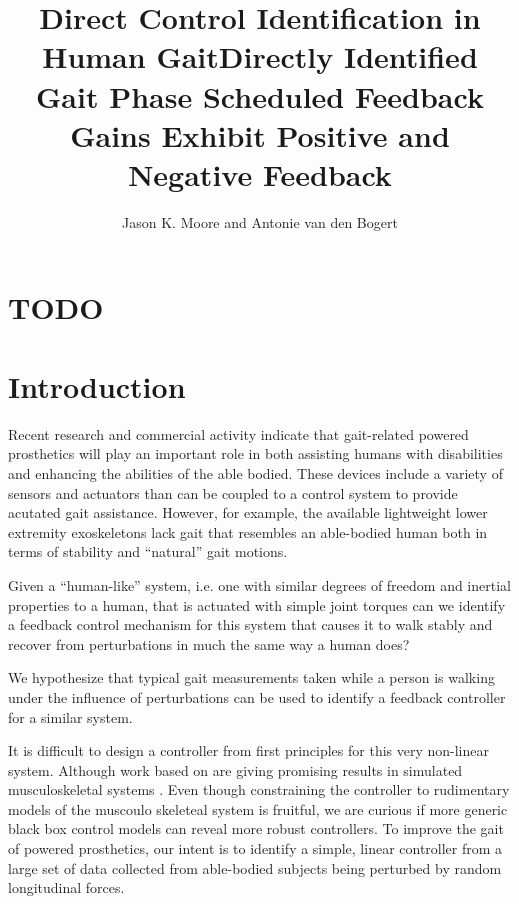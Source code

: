\documentclass{article}
\author{Jason K. Moore and Antonie van den Bogert}
\title{Direct Control Identification in Human Gait}
\title{Directly Identified Gait Phase Scheduled Feedback Gains Exhibit Positive
  and Negative Feedback}
\date{}
\begin{document}
\maketitle

\section*{TODO}

\listoftodos

\begin{abstract}
\end{abstract}

\section*{Introduction}
%
Recent research and commercial activity indicate that gait-related powered
prosthetics will play an important role in both assisting humans with
disabilities and enhancing the abilities of the able bodied. These devices
include a variety of sensors and actuators than can be coupled to a control
system to provide acutated gait assistance. However, for example, the available
lightweight lower extremity exoskeletons lack gait that resembles an
able-bodied human both in terms of stability and ``natural'' gait motions.

Given a ``human-like'' system, i.e. one with similar degrees of freedom and
inertial properties to a human, that is actuated with simple joint torques can
we identify a feedback control mechanism for this system that causes it to
walk stably and recover from perturbations in much the same way a human does?

We hypothesize that typical gait measurements taken while a person is
walking under the influence of perturbations can be used to identify a
feedback controller for a similar system.

It is difficult to design a controller from first principles
for this very non-linear system. Although work based on \cite{Geyer2010} are
giving promising results in simulated musculoskeletal systems \cite{Wang2010,
Geitenbeek2014}. Even though constraining the controller to rudimentary models
of the muscoulo skeleteal system is fruitful, we are curious if more generic
black box control models can reveal more robust controllers. To improve the
gait of powered prosthetics, our intent is to identify a simple, linear
controller from a large set of data collected from able-bodied subjects being
perturbed by random longitudinal forces.
\end{document}
